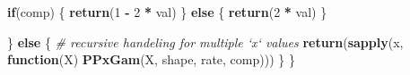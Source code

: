 \documentclass[]{article}
\newenvironment{Shaded}{\begin{snugshade}}{\end{snugshade}}
\newcommand{\KeywordTok}[1]{\textcolor[rgb]{0.13,0.29,0.53}{\textbf{#1}}}
\newcommand{\DecValTok}[1]{\textcolor[rgb]{0.00,0.00,0.81}{#1}}
\newcommand{\StringTok}[1]{\textcolor[rgb]{0.31,0.60,0.02}{#1}}
\newcommand{\CommentTok}[1]{\textcolor[rgb]{0.56,0.35,0.01}{\textit{#1}}}
\newcommand{\ControlFlowTok}[1]{\textcolor[rgb]{0.13,0.29,0.53}{\textbf{#1}}}
\newcommand{\OperatorTok}[1]{\textcolor[rgb]{0.81,0.36,0.00}{\textbf{#1}}}
\newcommand{\NormalTok}[1]{#1}
\begin{document}
\begin{Shaded}
\begin{Highlighting}[]
        \ControlFlowTok{if}\NormalTok{(comp) \{}
            \KeywordTok{return}\NormalTok{(}\DecValTok{1} \OperatorTok{-}\StringTok{ }\DecValTok{2} \OperatorTok{*}\StringTok{ }\NormalTok{val)}
\NormalTok{        \} }\ControlFlowTok{else}\NormalTok{ \{}
            \KeywordTok{return}\NormalTok{(}\DecValTok{2} \OperatorTok{*}\StringTok{ }\NormalTok{val)}
\NormalTok{        \}}
        
\NormalTok{    \} }\ControlFlowTok{else}\NormalTok{ \{}
        \CommentTok{# recursive handeling for multiple `x` values}
        \KeywordTok{return}\NormalTok{(}\KeywordTok{sapply}\NormalTok{(x, }\ControlFlowTok{function}\NormalTok{(X) }\KeywordTok{PPxGam}\NormalTok{(X, shape, rate, comp)))}
\NormalTok{    \}}
\NormalTok{\}}
\end{Highlighting}
\end{Shaded}
\end{document}
